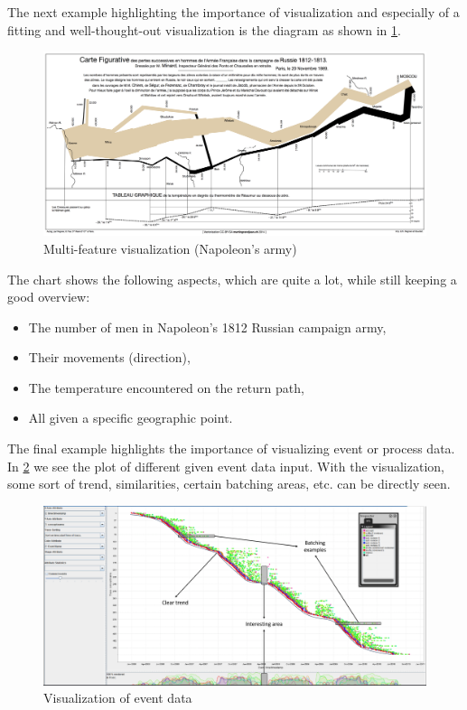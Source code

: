 The next example highlighting the importance of visualization and especially of a fitting and well-thought-out visualization is the diagram as shown in \ref{fig:2_napoleon}. 

\begin{figure}[h]
  \centering
  \includegraphics[width=\textwidth]{assets/visualization_and_extraction/napolean.png}
  \caption{Multi-feature visualization (Napoleon's army)}
  \label{fig:2_napoleon}
\end{figure}

The chart shows the following aspects, which are quite a lot, while still keeping a good overview:
\begin{itemize}
  \item The number of men in Napoleon's 1812 Russian campaign army,
  \item Their movements (direction),
  \item The temperature encountered on the return path,
  \item All given a specific geographic point.
\end{itemize}

The final example highlights the importance of visualizing event or process data. In \ref{fig:2_event_data} we see the plot of different given event data input. With the visualization, some sort of trend, similarities, certain batching areas, etc. can be directly seen.

\begin{figure}[h]
  \centering
  \includegraphics[width=\textwidth]{assets/visualization_and_extraction/event_data_visualization.png}
  \caption{Visualization of event data}
  \label{fig:2_event_data}
\end{figure}

